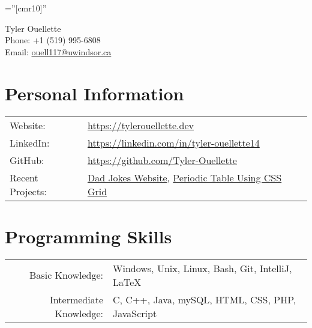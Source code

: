 \documentclass[a4paper,10.5pt]{article}
\begin{document}
\pagestyle{empty} %

\font\fb=''[cmr10]'' %

\par{\centering
		{\Huge Tyler {Ouellette}\\
    \small{Phone:}     +1 (519) 995-6808\\
    \small {Email:}     \href{mailto:ouell117@uwindsor.ca}{ouell117@uwindsor.ca}
	}\bigskip\par}

\section{Personal Information}

\begin{tabular}{ll}
     {Website:} & \href{https://tylerouellette.dev}{https://tylerouellette.dev}\\
     {LinkedIn:}     &\href{https://linkedin.com/in/tyler-ouellette14}{https://linkedin.com/in/tyler-ouellette14}\\
     {GitHub:}     & \href{https://github.com/Tyler-Ouellette}{https://github.com/Tyler-Ouellette}\\
     Recent Projects: & \href{https://dadjokes.myweb.cs.uwindsor.ca/index.php}{Dad Jokes Website}, \href{https://dadjokes.myweb.cs.uwindsor.ca/gridTest.html}{Periodic Table Using CSS Grid}
     
\end{tabular}

\section{Programming Skills}
\begin{tabular}{rl}
Basic Knowledge: &  Windows, Unix, Linux, Bash, Git, IntelliJ, LaTeX \\
 
Intermediate Knowledge: & C, C++, Java, mySQL, HTML, CSS, PHP, JavaScript  \\

\end{tabular}

\end{document}
